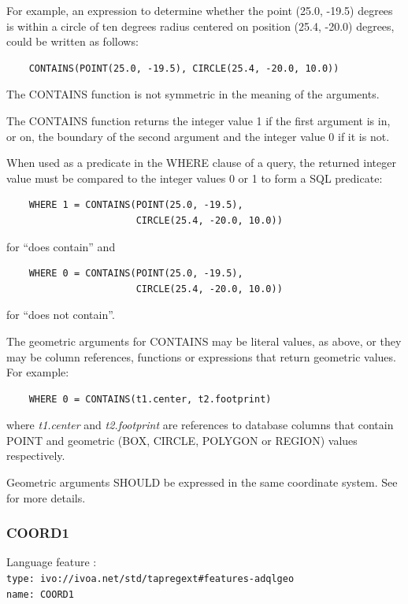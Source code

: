 \documentclass[11pt,a4paper]{ivoa}
\begin{document}
For example, an expression to determine whether the point (25.0, -19.5) degrees
is within a circle of ten degrees radius centered on position (25.4, -20.0)
degrees, could be written as follows:
\begin{verbatim}
    CONTAINS(POINT(25.0, -19.5), CIRCLE(25.4, -20.0, 10.0))
\end{verbatim}

The CONTAINS function is not symmetric in the meaning of the arguments.

The CONTAINS function returns the integer value 1 if the first argument
is in, or on, the boundary of the second argument and the integer value 0
if it is not.

When used as a predicate in the WHERE clause of a query, the returned integer
value must be compared to the integer values 0 or 1 to form a SQL predicate:
\begin{verbatim}
    WHERE 1 = CONTAINS(POINT(25.0, -19.5),
                       CIRCLE(25.4, -20.0, 10.0))
\end{verbatim}
\noindent
for ``does contain'' and
\begin{verbatim}
    WHERE 0 = CONTAINS(POINT(25.0, -19.5),
                       CIRCLE(25.4, -20.0, 10.0))
\end{verbatim}
\noindent
for ``does not contain''.


The geometric arguments for CONTAINS may be literal values, as above,
or they may be column references, functions or expressions that return
geometric values.
For example:
\begin{verbatim}
    WHERE 0 = CONTAINS(t1.center, t2.footprint)
\end{verbatim}
where \textit{t1.center} and \textit{t2.footprint} are references to
database columns that contain POINT and geometric (BOX, CIRCLE, POLYGON or REGION)
values respectively.

Geometric arguments SHOULD be expressed in the same coordinate system.
See  for more details.

\subsubsection{COORD1}
\label{sec:functions.geom.coord1}
{\footnotesize Language feature :}\\
{\footnotesize \verb|type: ivo://ivoa.net/std/tapregext#features-adqlgeo|}\\
{\footnotesize \verb|name: COORD1|}\\
\end{document}
